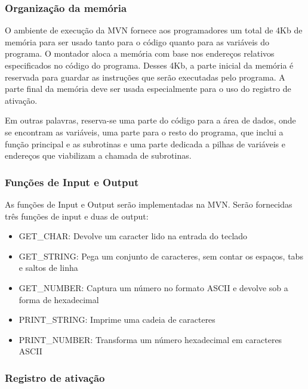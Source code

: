 \subsubsection{Organização da memória}
  \label{chap:org_memoria}

O ambiente de execução da MVN fornece aos programadores um total de 4Kb de memória para ser usado tanto para o código quanto para as variáveis do programa. O montador aloca a memória com base nos endereços relativos especificados no código do programa. Desses 4Kb, a parte inicial da memória é reservada para guardar as instruções que serão executadas pelo programa. A parte final da memória deve ser usada especialmente para o uso do registro de ativação.


Em outras palavras, reserva-se uma parte do código para a área de dados, onde se encontram as variáveis, uma parte para o resto do programa, que inclui a função principal e as subrotinas e uma parte dedicada a pilhas de variáveis e endereços que viabilizam a chamada de subrotinas.

\subsubsection{Funções de Input e Output}
  \label{chap:in_out}

As funções de Input e Output serão implementadas na MVN. Serão fornecidas três funções de input e duas de output:

\begin{itemize}
	\item GET\_CHAR: Devolve um caracter lido na entrada do teclado

	\item GET\_STRING: Pega um conjunto de caracteres, sem contar os espaços, tabs e saltos de linha
	
	\item GET\_NUMBER: Captura um número no formato ASCII e devolve sob a forma de hexadecimal
	
	\item PRINT\_STRING: Imprime uma cadeia de caracteres
	
	\item PRINT\_NUMBER: Transforma um número hexadecimal em caracteres ASCII
\end{itemize}

\subsubsection{Registro de ativação}
  \label{chap:in_out}

